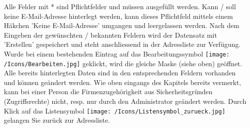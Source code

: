 
\vspace{\baselineskip}
Alle Felder mit * sind Pflichtfelder und müssen ausgefüllt werden. Kann / soll keine E-Mail-Adresse hinterlegt werden, kann dieses Pflichtfeld mittels einem Häkchen 'Keine E-Mail-Adresse'  umgangen und leergelassen werden. Nach dem Eingeben der gewünschten / bekannten Feldern wird der Datensatz mit 'Erstellen'  gespeichert und steht anschliessend in der Adressliste zur Verfügung. Wurde bei einem bestehenden Eintrag auf das Bearbeitungssymbol \texttt{[image: /Icons/Bearbeiten.jpg]} geklickt, wird die gleiche Maske (siehe oben) geöffnet. Alle bereits hinterlegten Daten sind in den entsprechenden Feldern vorhanden und können geändert werden. Wie oben eingangs des Kapitels bereits vermerkt, kann bei einer Person die Firmenzugehörigkeit aus Sicherheitsgründen (Zugriffsrechte) nicht, resp. nur durch den Administrator geändert werden.\newline
Durch Klick auf das Listensymbol \texttt{[image: /Icons/Listensymbol\_zurueck.jpg]}  gelangen Sie zurück zur Adressliste.
